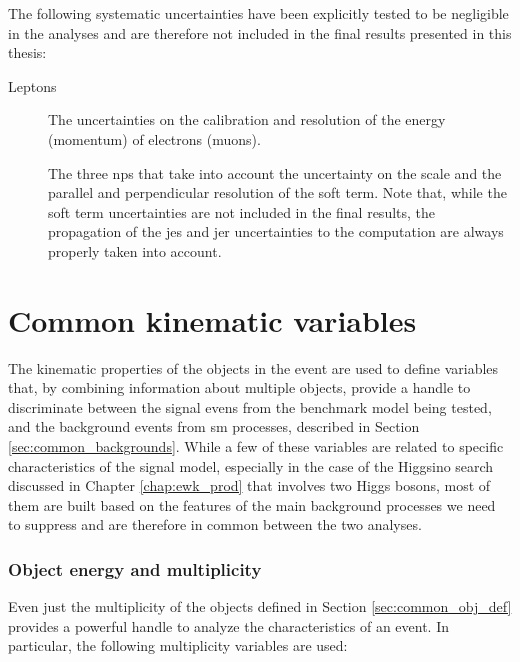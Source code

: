\noindent The following systematic uncertainties have been explicitly tested to be negligible in the analyses and are therefore not included in the final results presented in this thesis:

\begin{description}
\item[Leptons] The uncertainties on the calibration and resolution of the energy (momentum) of electrons (muons).

\item[\met] The three \glspl{np} that take into
account the uncertainty on the scale and the parallel and perpendicular resolution of the \met soft term. 
Note that, while the \met soft term uncertainties are not included in the final results, 
the propagation of the \gls{jes} and \gls{jer} uncertainties to the \met computation 
are always properly taken into account.

\end{description}


\section{Common kinematic variables}
\label{sec:common_variables}

The kinematic properties of the objects in the event are used to define variables that, by combining information about multiple objects, 
provide a handle to discriminate between the signal evens from the benchmark model being tested, and the background events from \gls{sm} processes, described in Section \ref{sec:common_backgrounds}. 
While a few of these variables are related to specific characteristics of the signal model, especially in the case of the Higgsino search 
discussed in Chapter \ref{chap:ewk_prod} that involves two Higgs bosons, most of them are built based on the features of the main  
background processes we need to suppress and are therefore in common between the two analyses. 

\subsubsection*{Object energy and multiplicity}

Even just the multiplicity of the objects defined in Section \ref{sec:common_obj_def} provides a powerful handle to analyze the characteristics of an event. In particular, the following multiplicity variables are used:

